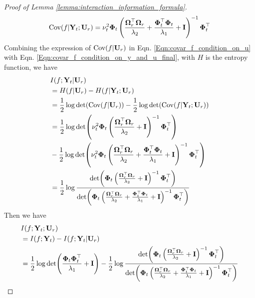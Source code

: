\begin{proof}[Proof of Lemma \ref{lemma:interaction_information_formula}]
\begin{equation}
\label{Eqn:covar_f_condition_on_y_and_u_final}
    \textup{Cov}(f \rvert \mathbf{Y}_t; \mathbf{U}_r) = \nu_t^2\boldsymbol{\Phi}_t \left(\frac{\boldsymbol{\Omega}_r^\top\boldsymbol{\Omega}_r}{\lambda_2}+\frac{\boldsymbol{\Phi}_t^\top \boldsymbol{\Phi}_t} {\lambda_1} + \mathbf{I}\right)^{-1} \boldsymbol{\Phi}_t^\top
\end{equation}
Combining the expression of $\textup{Cov}(f\rvert \mathbf{U}_r)$ in Eqn. \ref{Eqn:covar_f_condition_on_u} with Eqn. \ref{Eqn:covar_f_condition_on_y_and_u_final}, with $H$ is the entropy function, we have
\begin{align}
     & I(f;\mathbf{Y}_t \rvert \mathbf{U}_r)  \notag
     \\
     &= H(f \rvert \mathbf{U}_r) - H(f \rvert \mathbf{Y}_t; \mathbf{U}_r) \\
     & = \frac{1}{2}\log\det (\textup{Cov}(f \rvert \mathbf{U}_r)) - \frac{1}{2}\log\det (\textup{Cov}(f \rvert \mathbf{Y}_t;  \mathbf{U}_r)) \\
     & = \frac{1}{2}\log \det (\nu_t^2\boldsymbol{\Phi}_t \left(\frac{\boldsymbol{\Omega}_r^\top \boldsymbol{\Omega}_r}{\lambda_2} + \mathbf{I}\right)^{-1} \boldsymbol{\Phi}_t^\top) \notag \\
     & - \frac{1}{2}\log\det (\nu_t^2\boldsymbol{\Phi}_t \left(\frac{\boldsymbol{\Omega}_r^\top\boldsymbol{\Omega}_r}{\lambda_2}+\frac{\boldsymbol{\Phi}_t^\top \boldsymbol{\Phi}_t} {\lambda_1} + \mathbf{I}\right)^{-1} \boldsymbol{\Phi}_t^\top) \\
\label{Eqn:conditional_information_f_and_Yt_give_Ur}
     &= \frac{1}{2} \log \frac{\det(\boldsymbol{\Phi}_t \left(\frac{\boldsymbol{\Omega}_r^\top \boldsymbol{\Omega}_r}{\lambda_2} + \mathbf{I}\right)^{-1} \boldsymbol{\Phi}_t^\top)}{\det(\boldsymbol{\Phi}_t \left(\frac{\boldsymbol{\Omega}_r^\top\boldsymbol{\Omega}_r}{\lambda_2}+\frac{\boldsymbol{\Phi}_t^\top \boldsymbol{\Phi}_t} {\lambda_1} + \mathbf{I}\right)^{-1} \boldsymbol{\Phi}_t^\top)}
\end{align}
Then we have 
\begin{align}
    & I (f; \mathbf{Y}_t; \mathbf{U}_r) \notag \\
    & =  I(f; \mathbf{Y}_t) - I (f; \mathbf{Y}_t \rvert \mathbf{U}_r) \\
        &= \frac{1}{2} \log \det (\frac{\boldsymbol{\Phi}_t\boldsymbol{\Phi}_t^\top}{\lambda_1} +\mathbf{I}) - \frac{1}{2} \log \frac{\det(\boldsymbol{\Phi}_t \left(\frac{\boldsymbol{\Omega}_r^\top \boldsymbol{\Omega}_r}{\lambda_2} + \mathbf{I}\right)^{-1} \boldsymbol{\Phi}_t^\top)}{\det(\boldsymbol{\Phi}_t \left(\frac{\boldsymbol{\Omega}_r^\top\boldsymbol{\Omega}_r}{\lambda_2}+\frac{\boldsymbol{\Phi}_t^\top \boldsymbol{\Phi}_t} {\lambda_1} + \mathbf{I}\right)^{-1} \boldsymbol{\Phi}_t^\top)} 

\end{align}
\end{proof}
